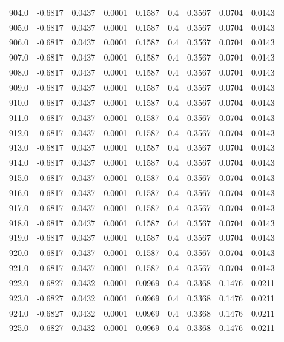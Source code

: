 \begin{longtable}{lrrrrrrrr}
904.0 & -0.6817 & 0.0437 & 0.0001 & 0.1587 & 0.4 & 0.3567 & 0.0704 & 0.0143 \\
905.0 & -0.6817 & 0.0437 & 0.0001 & 0.1587 & 0.4 & 0.3567 & 0.0704 & 0.0143 \\
906.0 & -0.6817 & 0.0437 & 0.0001 & 0.1587 & 0.4 & 0.3567 & 0.0704 & 0.0143 \\
907.0 & -0.6817 & 0.0437 & 0.0001 & 0.1587 & 0.4 & 0.3567 & 0.0704 & 0.0143 \\
908.0 & -0.6817 & 0.0437 & 0.0001 & 0.1587 & 0.4 & 0.3567 & 0.0704 & 0.0143 \\
909.0 & -0.6817 & 0.0437 & 0.0001 & 0.1587 & 0.4 & 0.3567 & 0.0704 & 0.0143 \\
910.0 & -0.6817 & 0.0437 & 0.0001 & 0.1587 & 0.4 & 0.3567 & 0.0704 & 0.0143 \\
911.0 & -0.6817 & 0.0437 & 0.0001 & 0.1587 & 0.4 & 0.3567 & 0.0704 & 0.0143 \\
912.0 & -0.6817 & 0.0437 & 0.0001 & 0.1587 & 0.4 & 0.3567 & 0.0704 & 0.0143 \\
913.0 & -0.6817 & 0.0437 & 0.0001 & 0.1587 & 0.4 & 0.3567 & 0.0704 & 0.0143 \\
914.0 & -0.6817 & 0.0437 & 0.0001 & 0.1587 & 0.4 & 0.3567 & 0.0704 & 0.0143 \\
915.0 & -0.6817 & 0.0437 & 0.0001 & 0.1587 & 0.4 & 0.3567 & 0.0704 & 0.0143 \\
916.0 & -0.6817 & 0.0437 & 0.0001 & 0.1587 & 0.4 & 0.3567 & 0.0704 & 0.0143 \\
917.0 & -0.6817 & 0.0437 & 0.0001 & 0.1587 & 0.4 & 0.3567 & 0.0704 & 0.0143 \\
918.0 & -0.6817 & 0.0437 & 0.0001 & 0.1587 & 0.4 & 0.3567 & 0.0704 & 0.0143 \\
919.0 & -0.6817 & 0.0437 & 0.0001 & 0.1587 & 0.4 & 0.3567 & 0.0704 & 0.0143 \\
920.0 & -0.6817 & 0.0437 & 0.0001 & 0.1587 & 0.4 & 0.3567 & 0.0704 & 0.0143 \\
921.0 & -0.6817 & 0.0437 & 0.0001 & 0.1587 & 0.4 & 0.3567 & 0.0704 & 0.0143 \\
922.0 & -0.6827 & 0.0432 & 0.0001 & 0.0969 & 0.4 & 0.3368 & 0.1476 & 0.0211 \\
923.0 & -0.6827 & 0.0432 & 0.0001 & 0.0969 & 0.4 & 0.3368 & 0.1476 & 0.0211 \\
924.0 & -0.6827 & 0.0432 & 0.0001 & 0.0969 & 0.4 & 0.3368 & 0.1476 & 0.0211 \\
925.0 & -0.6827 & 0.0432 & 0.0001 & 0.0969 & 0.4 & 0.3368 & 0.1476 & 0.0211 \\

\end{longtable}
